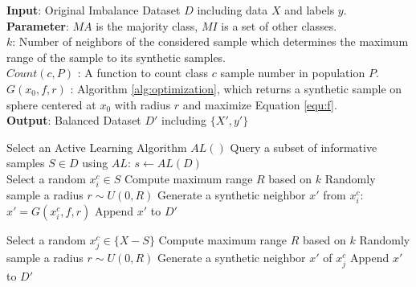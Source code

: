 \begin{algorithm}[!htb]
	\caption{\Methodname}
	
	\begin{flushleft}
		\textbf{Input}: Original Imbalance Dataset $D$ including data $X$ and labels $y$.\\
		\textbf{Parameter}: 
		$MA$ is the majority class, $MI$ is a set of other classes.\\
		$k$: Number of  neighbors of the considered sample which determines the maximum range of the sample to its synthetic samples.\\ 
		$Count(c, P)$ : A function to count class $c$ sample number in population $P$.\\
		$G(x_0,f,r)$ : Algorithm \ref{alg:optimization}, which returns a synthetic sample on sphere centered at $x_0$ with radius $r$ and maximize Equation \ref{equ:f}.  \\
		\textbf{Output}: Balanced Dataset $D'$ including $\{X',y'\}$
		\begin{algorithmic}[1]
			\STATE Select an Active Learning Algorithm $AL()$
			\STATE Query a subset of informative samples $S \in D$  using $AL$:
			$s  \leftarrow AL(D) $	\\
			
			\STATE Select a random $x_i^c \in S$
			\STATE Compute maximum range $R$ based on $k$
			\STATE  Randomly sample a radius $r \sim U(0,R)$
			\STATE Generate a synthetic neighbor $x'$ from $x_i^c$:
			$x'=G(x_i^c,f,r)$ 
			\STATE Append $x'$ to $D'$
			\ENDWHILE
			\ENDFOR
			
			\STATE Select a random $x_j^c \in \{X-S\}$
			\STATE Compute maximum range $R$ based on $k$
			\STATE  Randomly sample a radius $r \sim U(0,R)$
			\STATE Generate a synthetic neighbor $x'$ of $x_j^c$ 
			\STATE Append $x'$ to $D'$
			\ENDWHILE
			\ENDFOR
			\RETURN 
		\end{algorithmic}
	\end{flushleft}
	\label{alg:SIMPOR}
\end{algorithm}